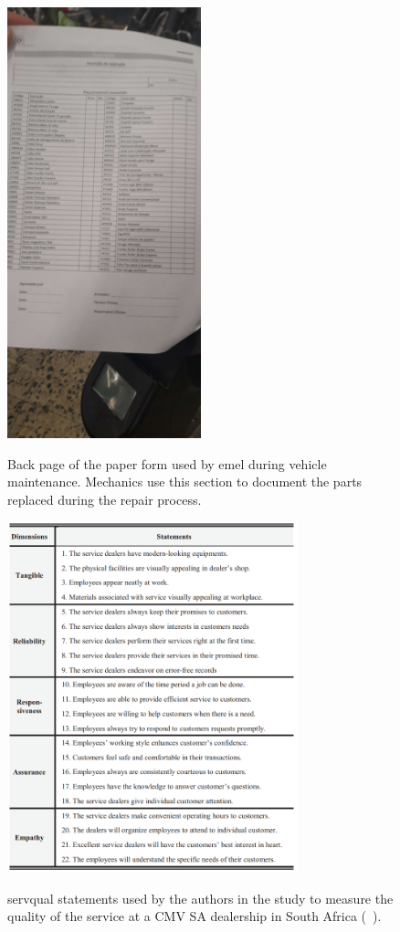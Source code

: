 \begin{figure}[htbp]
  \caption{Back page of the paper form used by \acs{emel} during vehicle maintenance. Mechanics use this section to document the parts replaced during the repair process.}
  \centering
  \includegraphics[width=0.50\textwidth]{figs/chapter2/emel_back}
  \label{fig:emel_back}
\end{figure}


\begin{figure}[htbp]
  \caption{\ac{servqual} statements used by the authors in the study to measure the quality of the service at a CMV SA dealership in South Africa (~\cite{Measuring_After_sales_Service_Quality}).}
  \centering
  \includegraphics[width=0.75\textwidth]{figs/SERVQUAL_statements}
  \label{fig:SERVQUAL_statements}
\end{figure}


